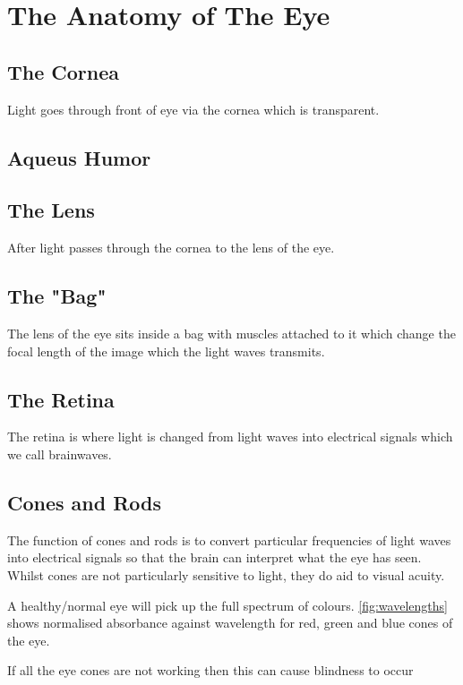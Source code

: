 
\chapter{The Anatomy of The Eye}

\label{anatomy} %


\section{The Cornea}

Light goes through front of eye via the cornea which is transparent.\cite{}

\section{Aqueus Humor}

\section{The Lens}
After light passes through the cornea to the lens of the eye.

\section{The "Bag"}
The lens of the eye sits inside a bag with muscles attached to it which change
the focal length of the image which the light waves transmits.

\section{The Retina}
The retina is where light is changed from light waves into electrical signals
which we call brainwaves.

\section{Cones and Rods}

The function of cones and rods is to convert particular frequencies of light
waves
into electrical signals so that the brain can interpret what the eye has seen.
Whilst cones are not particularly sensitive to light, they do aid to visual
acuity.
\cite{}

A healthy/normal eye will pick up the full spectrum of colours.
\ref{fig:wavelengths} shows normalised absorbance against wavelength for red,
green and blue cones of the eye.

If all the eye cones are not working then this can cause
blindness to occur\cite{}
